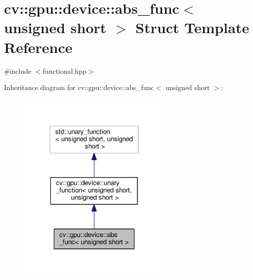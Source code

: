 \hypertarget{structcv_1_1gpu_1_1device_1_1abs__func_3_01unsigned_01short_01_4}{\section{cv\-:\-:gpu\-:\-:device\-:\-:abs\-\_\-func$<$ unsigned short $>$ Struct Template Reference}
\label{structcv_1_1gpu_1_1device_1_1abs__func_3_01unsigned_01short_01_4}
}


{\ttfamily \#include $<$functional.\-hpp$>$}



Inheritance diagram for cv\-:\-:gpu\-:\-:device\-:\-:abs\-\_\-func$<$ unsigned short $>$\-:\nopagebreak
\begin{figure}[H]
\begin{center}
\leavevmode
\includegraphics[width=214pt]{structcv_1_1gpu_1_1device_1_1abs__func_3_01unsigned_01short_01_4__inherit__graph}
\end{center}
\end{figure}


